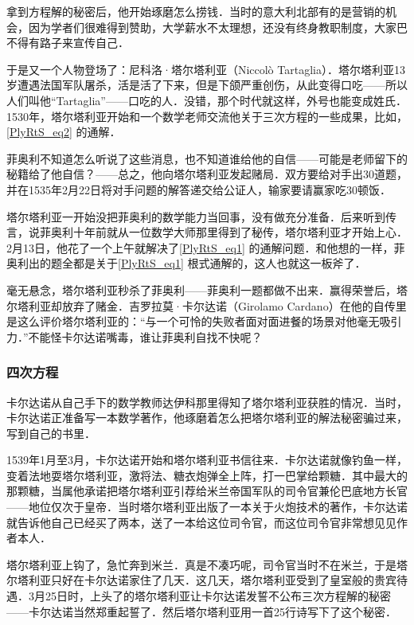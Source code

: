 拿到方程解的秘密后，他开始琢磨怎么捞钱．当时的意大利北部有的是营销的机会，因为学者们很难得到赞助，大学薪水不太理想，还没有终身教职制度，大家巴不得有路子来宣传自己．

于是又一个人物登场了：尼科洛·塔尔塔利亚（Niccolò Tartaglia）．塔尔塔利亚13岁遭遇法国军队屠杀，活是活了下来，但是下颌严重创伤，从此变得口吃——所以人们叫他“Tartaglia”——口吃的人．没错，那个时代就这样，外号也能变成姓氏．1530年，塔尔塔利亚开始和一个数学老师交流他关于三次方程的一些成果，比如，\autoref{PlyRtS_eq2} 的通解．

菲奥利不知道怎么听说了这些消息，也不知道谁给他的自信——可能是老师留下的秘籍给了他自信？——总之，他向塔尔塔利亚发起赌局．双方要给对手出30道题，并在1535年2月22日将对手问题的解答递交给公证人，输家要请赢家吃30顿饭．

塔尔塔利亚一开始没把菲奥利的数学能力当回事，没有做充分准备．后来听到传言，说菲奥利十年前就从一位数学大师那里得到了秘传，塔尔塔利亚才开始上心．2月13日，他花了一个上午就解决了\autoref{PlyRtS_eq1} 的通解问题．和他想的一样，菲奥利出的题全都是关于\autoref{PlyRtS_eq1} 根式通解的，这人也就这一板斧了．

毫无悬念，塔尔塔利亚秒杀了菲奥利——菲奥利一题都做不出来．赢得荣誉后，塔尔塔利亚却放弃了赌金．吉罗拉莫·卡尔达诺（Girolamo Cardano）在他的自传里是这么评价塔尔塔利亚的：“与一个可怜的失败者面对面进餐的场景对他毫无吸引力．”不能怪卡尔达诺嘴毒，谁让菲奥利自找不快呢？

\subsubsection{四次方程}

卡尔达诺从自己手下的数学教师达伊科那里得知了塔尔塔利亚获胜的情况．当时，卡尔达诺正准备写一本数学著作，他琢磨着怎么把塔尔塔利亚的解法秘密骗过来，写到自己的书里．

1539年1月至3月，卡尔达诺开始和塔尔塔利亚书信往来．卡尔达诺就像钓鱼一样，变着法地耍塔尔塔利亚，激将法、糖衣炮弹全上阵，打一巴掌给颗糖．其中最大的那颗糖，当属他承诺把塔尔塔利亚引荐给米兰帝国军队的司令官兼伦巴底地方长官——地位仅次于皇帝．当时塔尔塔利亚出版了一本关于火炮技术的著作，卡尔达诺就告诉他自己已经买了两本，送了一本给这位司令官，而这位司令官非常想见见作者本人．

塔尔塔利亚上钩了，急忙奔到米兰．真是不凑巧呢，司令官当时不在米兰，于是塔尔塔利亚只好在卡尔达诺家住了几天．这几天，塔尔塔利亚受到了皇室般的贵宾待遇．3月25日时，上头了的塔尔塔利亚让卡尔达诺发誓不公布三次方程解的秘密——卡尔达诺当然郑重起誓了．然后塔尔塔利亚用一首25行诗写下了这个秘密．

